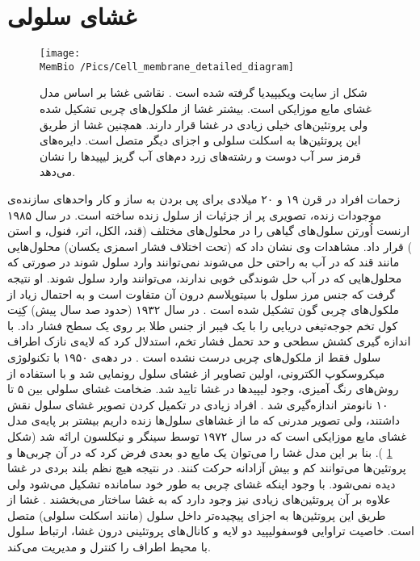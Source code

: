 \setRL
{} 


\section{\label{sec:cellmembrane}
غشای سلولی
}
\begin{figure}[h]
\begin{center}
\texttt{[image: \\MemBio /Pics/Cell\_membrane\_detailed\_diagram]}
\caption{
شکل از سایت ویکیپیدیا گرفته شده است
\cite{wikiCellMembrane}
. نقاشی غشا بر اساس مدل غشای مایع موزایکی است. بیشتر غشا از ملکول‌های چربی تشکیل شده ولی پروتئین‌های خیلی زیادی در غشا قرار دارند. همچنین غشا از طریق این پروتئین‌ها به اسکلت سلولی و اجزای دیگر متصل است. دایره‌های قرمز سر آب دوست و رشته‌های زرد دم‌های آب گریز لیپید‌ها را نشان می‌دهد.
}
\label{fig:fluidmembranemodel}
\end{center}
\end{figure}

زحمات افراد در قرن ۱۹ و ۲۰ میلادی برای پی بردن به ساز و کار واحد‌های سازنده‌ی موجودات زنده، تصویری پر از جزئیات از سلول زنده ساخته است. در سال ۱۹۸۵ ارنست اُورتن 
سلول‌های گیاهی را در محلول‌های مختلف (قند،‌ الکل، اتر، فنول، و استن
) قرار داد. مشاهدات وی نشان داد که (تحت اختلاف فشار اسمزی یکسان) محلول‌هایی مانند قند که در آب به راحتی حل می‌شوند نمی‌توانند وارد سلول شوند در صورتی که محلول‌هایی که در آب حل شوندگی خوبی ندارند، می‌توانند وارد سلول شوند. او نتیجه گرفت که جنس مرز سلول با سیتوپلاسم درون آن متفاوت است و به احتمال زیاد از ملکول‌های چربی گون تشکیل شده است
\cite{overton1985}
. در سال ۱۹۳۲ (حدود صد سال پیش) کِنِت کول
 تخم جوجه‌تیغی دریایی
 را با یک فیبر از جنس طلا بر روی یک سطح فشار داد. با اندازه گیری  کشش سطحی و حد تحمل فشار تخم، استدلال کرد که لایه‌ی نازک اطراف سلول فقط از ملکول‌های چربی درست نشده است
 \cite{Cole1932}
. در دهه‌ی ۱۹۵۰ با تکنولوژی میکروسکوپ الکترونی، اولین تصاویر از غشای سلول رونمایی شد و با استفاده از روش‌های رنگ آمیزی، وجود لیپید‌ها
 در غشا تایید شد. 
ضخامت غشای سلولی بین ۵ تا ۱۰ نانومتر اندازه‌گیری شد
\cite{ROBERTSON1959aa}
. افراد زیادی در تکمیل‌ کردن تصویر غشای سلول  نقش داشتند، ولی تصویر مدرنی که ما از غشاهای سلول‌ها زنده داریم بیشتر بر پایه‌ی مدل غشای مایع موزایکی‌
 است که در سال ۱۹۷۲ توسط سینگر
  و نیکلسون
 ارائه شد
\cite{Singer1972}
(شکل 
\ref{fig:fluidmembranemodel}
). بنا بر این مدل غشا را می‌توان یک مایع دو بعدی فرض کرد که در آن چربی‌ها و پروتئین‌ها می‌توانند کم و بیش آزادانه حرکت کنند. در نتیجه هیچ نظم بلند بردی در غشا دیده نمی‌شود. با وجود اینکه غشای چربی به طور خود سامانده تشکیل می‌شود ولی علاوه بر آن پروتئین‌های زیادی نیز وجود دارد که به غشا ساختار می‌بخشند
\cite{wikiCellMembrane}
. غشا از طریق این پروتئین‌ها به اجزای پیچیده‌تر داخل سلول (مانند اسکلت سلولی) متصل است. خاصیت تراوایی فوسفولیپید دو لایه و کانال‌های پروتئینی درون غشا، ارتباط سلول با محیط اطراف را کنترل و مدیریت می‌کند. 







